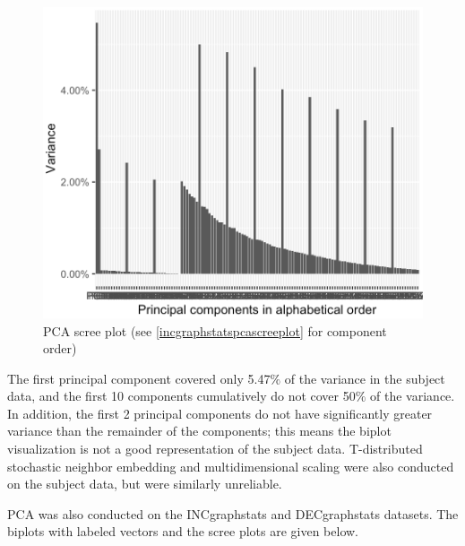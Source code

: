 \documentclass[12pt]{report}
\begin{document}
		\begin{figure}[H]
			\centering
			\includegraphics[scale=0.6]{Images/subjectdata_screeplot.png}
			\caption{PCA scree plot (see \ref{incgraphstatspcascreeplot} for component order)}
			\label{subjectdatapcascreeplot}
		\end{figure}
	
		The first principal component covered only 5.47$\%$ of the variance in the subject data, and the first 10 components cumulatively do not cover 50$\%$ of the variance. In addition, the first 2 principal components do not have significantly greater variance than the remainder of the components; this means the biplot visualization is not a good representation of the subject data. T-distributed stochastic neighbor embedding and multidimensional scaling were also conducted on the subject data, but were similarly unreliable.
		
		PCA was also conducted on the INCgraphstats and DECgraphstats datasets. The biplots with labeled vectors and the scree plots are given below.
		
\end{document}
